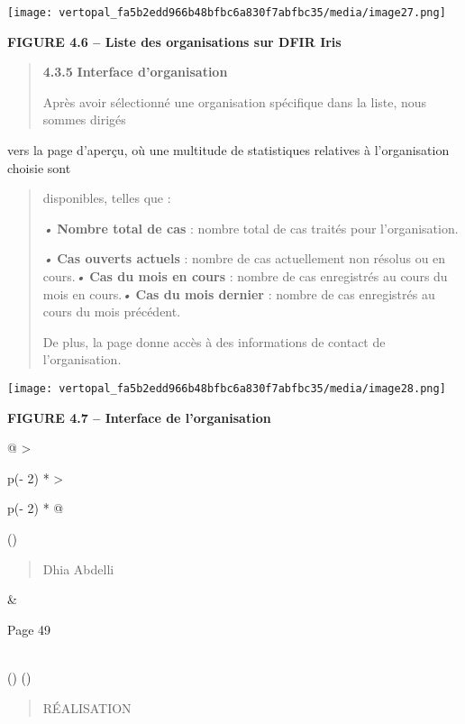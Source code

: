 \documentclass[
]{article}
\begin{document}
\texttt{[image: vertopal\_fa5b2edd966b48bfbc6a830f7abfbc35/media/image27.png]}

\textbf{FIGURE 4.6 -- Liste des organisations sur DFIR Iris}

\begin{quote}
\textbf{4.3.5} \textbf{Interface d'organisation}

Après avoir sélectionné une organisation spécifique dans la liste, nous
sommes dirigés
\end{quote}

vers la page d'aperçu, où une multitude de statistiques relatives à
l'organisation choisie sont

\begin{quote}
disponibles, telles que :

\emph{•} \textbf{Nombre total de cas} : nombre total de cas traités pour
l'organisation.

\emph{•} \textbf{Cas ouverts actuels} : nombre de cas actuellement non
résolus ou en cours.\emph{•} \textbf{Cas du mois en cours} : nombre de
cas enregistrés au cours du mois en cours.\emph{•} \textbf{Cas du mois
dernier} : nombre de cas enregistrés au cours du mois précédent.

De plus, la page donne accès à des informations de contact de
l'organisation.
\end{quote}

\texttt{[image: vertopal\_fa5b2edd966b48bfbc6a830f7abfbc35/media/image28.png]}

\textbf{FIGURE 4.7 -- Interface de l'organisation}

\begin{longtable}[]{@{}
  >{\raggedright\arraybackslash}p{(\columnwidth - 2\tabcolsep) * }
  >{\raggedright\arraybackslash}p{(\columnwidth - 2\tabcolsep) * }@{}}
\toprule()
\begin{minipage}[b]{\linewidth}\raggedright
\begin{quote}
Dhia Abdelli
\end{quote}
\end{minipage} & \begin{minipage}[b]{\linewidth}\raggedright
Page 49
\end{minipage} \\
\midrule()
\endhead
\bottomrule()
\end{longtable}

\begin{quote}
RÉALISATION
\end{quote}
\end{document}
